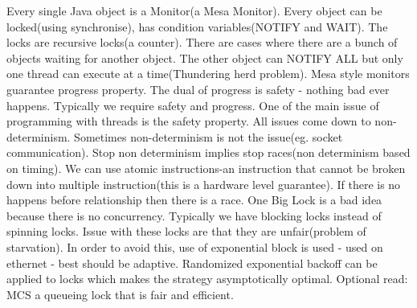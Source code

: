 \documentclass[twoside]{article}
\begin{document}
Every single Java object is a Monitor(a Mesa Monitor). Every object can be locked(using synchronise), has condition variables(NOTIFY and WAIT). The locks are recursive locks(a counter). There are cases where there are a bunch of objects waiting for another object. The other object can NOTIFY ALL but only one thread can execute at a time(Thundering herd problem). Mesa style monitors guarantee progress property. The dual of progress is safety - nothing bad ever happens. Typically we require safety and progress. One of the main issue of programming with threads is the safety property. All issues come down to non-determinism. Sometimes non-determinism is not the issue(eg. socket communication). Stop non determinism implies stop races(non determinism based on timing). We can use atomic instructions-an instruction that cannot be broken down into multiple instruction(this is a hardware level guarantee). If there is no happens before relationship then there is a race. One Big Lock is a bad idea because there is no concurrency. Typically we have blocking locks instead of spinning locks. Issue with these locks are that they are unfair(problem of starvation). In order to avoid this, use of exponential block is used - used on ethernet - best should be adaptive. Randomized exponential backoff can be applied to locks which makes the strategy asymptotically optimal. Optional read: MCS a queueing lock that is fair and efficient.
\end{document}
